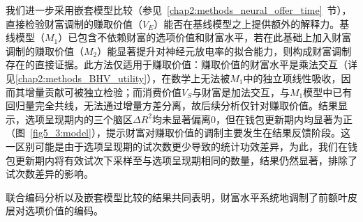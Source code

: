我们进一步采用嵌套模型比较（参见~\ref{chap2:methods_neural_offer_time}~节），直接检验财富调制的赚取价值（$V_E$）能否在基线模型之上提供额外的解释力。基线模型（$M_1$）已包含不依赖财富的选项价值和财富水平，若在此基础上加入财富调制的赚取价值（$M_2$）能显著提升对神经元放电率的拟合能力，则构成财富调制存在的直接证据。此方法仅适用于赚取价值：赚取价值的财富水平是乘法交互（详见\ref{chap2:methods_BHV_utility}），在数学上无法被$M_1$中的独立项线性吸收，因而其增量贡献可被独立检验；而消费价值$V_S$与财富是加法交互，与$M_1$模型中已有回归量完全共线，无法通过增量方差分离，故后续分析仅针对赚取价值。结果显示，选项呈现期内的三个脑区$\Delta R^2$均未显著偏离0，但在钱包更新期内均显著为正（图~\ref{fig5_3:model}），提示财富对赚取价值的调制主要发生在结果反馈阶段。这一区别可能是由于选项呈现期的试次数更少导致的统计功效差异，为此，我们在钱包更新期内将有效试次下采样至与选项呈现期相同的数量，结果仍然显著，排除了试次数差异的影响。

联合编码分析以及嵌套模型比较的结果共同表明，财富水平系统地调制了前额叶皮层对选项价值的编码。

